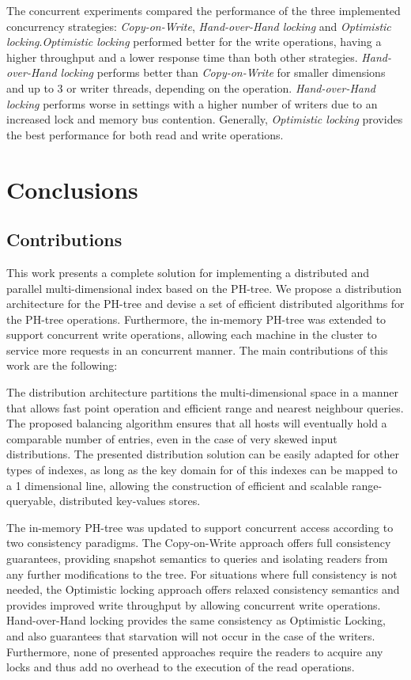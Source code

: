 \documentclass[11pt,a4paper]{globis-book}
\begin{document}
The concurrent experiments compared the performance of the three implemented concurrency strategies: \textit{Copy-on-Write}, \textit{Hand-over-Hand locking} and \textit{Optimistic locking}.\textit{Optimistic locking} performed better for the write operations, having a higher throughput and a lower response time than both other strategies. \textit{Hand-over-Hand locking} performs better than \textit{Copy-on-Write} for smaller dimensions and up to 3 or writer threads, depending on the operation. \textit{Hand-over-Hand locking} performs worse in settings with a higher number of writers due to an increased lock and memory bus contention. Generally, \textit{Optimistic locking} provides the best performance for both read and write operations.

\chapter{Conclusions}
\label{ch:conclusions}

\section{Contributions}
\label{sec:conclusions-contribution}

This work presents a complete solution for implementing a distributed and parallel multi-dimensional index based on the PH-tree. We propose a distribution architecture for the PH-tree and devise a set of efficient distributed algorithms for the PH-tree operations. Furthermore, the in-memory PH-tree was extended to support concurrent write operations, allowing each machine in the cluster to service more requests in an concurrent manner. The main contributions of this work are the following:

The distribution architecture partitions the multi-dimensional space in a manner that allows fast point operation and efficient range and nearest neighbour queries. The proposed balancing algorithm ensures that all hosts will eventually hold a comparable number of entries, even in the case of very skewed input distributions. The presented distribution solution can be easily adapted for other types of indexes, as long as the key domain for of this indexes can be mapped to a 1 dimensional line, allowing the construction of efficient and scalable range-queryable, distributed key-values stores.

The in-memory PH-tree was updated to support concurrent access according to two consistency paradigms. The Copy-on-Write approach offers full consistency guarantees, providing snapshot semantics to queries and isolating readers from any further modifications to the tree. For situations where full consistency is not needed, the Optimistic locking approach offers relaxed consistency semantics and provides improved write throughput by allowing concurrent write operations. Hand-over-Hand locking provides the same consistency as Optimistic Locking, and also guarantees that starvation will not occur in the case of the writers. Furthermore, none of presented approaches require the readers to acquire any locks and thus add no overhead to the execution of the read operations.
\end{document}
